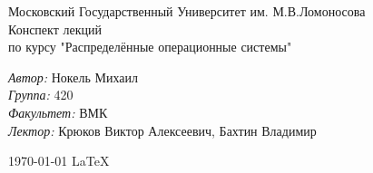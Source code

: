 \documentclass[a4paper,12pt]{article}
\date{}
\begin{document}
	\begin{titlepage}
		\begin{center}
			\large Московский Государственный Университет им. М.В.Ломоносова\\[4,5cm]
			\huge Конспект лекций \\[0,6cm]
			\large по курсу "Распределённые операционные системы"\\[3,7cm]
			\vspace{2cm}
			\begin{flushright}
						\emph{Автор:} Нокель Михаил\\
						\emph{Группа:} 420\\
						\emph{Факультет:} ВМК\\
						\emph{Лектор:} Крюков Виктор Алексеевич, Бахтин Владимир\\
			\end{flushright}					
			\vfill
			{\large \today}
			{\large \LaTeX}			
		\end{center}
	\thispagestyle{empty}			
	\end{titlepage}
	\newpage
	\tableofcontents
	\thispagestyle{empty}
	\newpage
\end{document}
